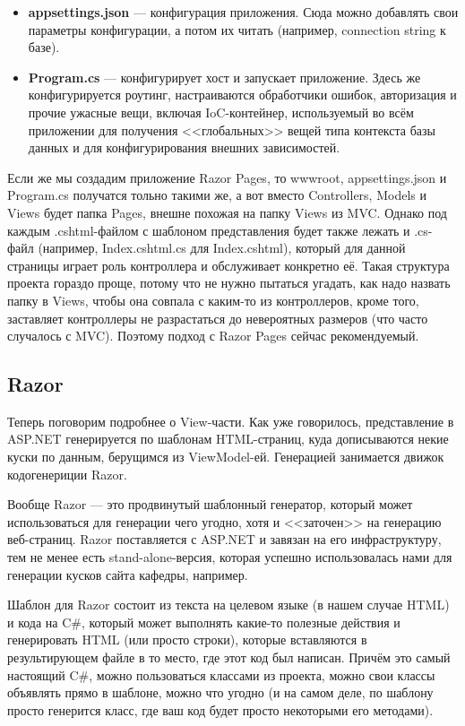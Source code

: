\documentclass[a5paper]{article}
\begin{document}
\begin{itemize}
    \item \textbf{appsettings.json} --- конфигурация приложения. Сюда можно добавлять свои параметры конфигурации, а потом их читать (например, connection string к базе).
    \item \textbf{Program.cs} --- конфигурирует хост и запускает приложение. Здесь же конфигурируется роутинг, настраиваются обработчики ошибок, авторизация и прочие ужасные вещи, включая IoC-контейнер, используемый во всём приложении для получения <<глобальных>> вещей типа контекста базы данных и для конфигурирования внешних зависимостей.
\end{itemize}

Если же мы создадим приложение Razor Pages, то wwwroot, appsettings.json и Program.cs получатся тольно такими же, а вот вместо Controllers, Models и Views будет папка Pages, внешне похожая на папку Views из MVC. Однако под каждым .cshtml-файлом с шаблоном представления будет также лежать и .cs-файл (например, Index.cshtml.cs для Index.cshtml), который для данной страницы играет роль контроллера и обслуживает конкретно её. Такая структура проекта гораздо проще, потому что не нужно пытаться угадать, как надо назвать папку в Views, чтобы она совпала с каким-то из контроллеров, кроме того, заставляет контроллеры не разрастаться до невероятных размеров (что часто случалось с MVC). Поэтому подход с Razor Pages сейчас рекомендуемый.

\subsection{Razor}

Теперь поговорим подробнее о View-части. Как уже говорилось, представление в ASP.NET генерируется по шаблонам HTML-страниц, куда дописываются некие куски по данным, берущимся из ViewModel-ей. Генерацией занимается движок кодогенериции Razor.

Вообще Razor --- это продвинутый шаблонный генератор, который может использоваться для генерации чего угодно, хотя и <<заточен>> на генерацию веб-страниц. Razor поставляется с ASP.NET и завязан на его инфраструктуру, тем не менее есть stand-alone-версия, которая успешно использовалась нами для генерации кусков сайта кафедры, например.

Шаблон для Razor состоит из текста на целевом языке (в нашем случае HTML) и кода на C\#, который может выполнять какие-то полезные действия и генерировать HTML (или просто строки), которые вставляются в результирующем файле в то место, где этот код был написан. Причём это самый настоящий C\#, можно пользоваться классами из проекта, можно свои классы объявлять прямо в шаблоне, можно что угодно (и на самом деле, по шаблону просто генерится класс, где ваш код будет просто некоторыми его методами).
\end{document}
